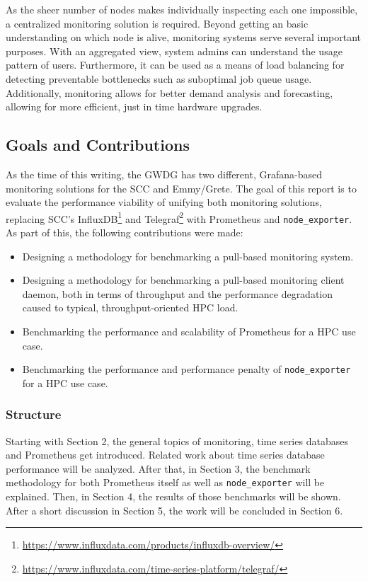 As the sheer number of nodes makes individually inspecting each one impossible, a centralized
monitoring solution is required. Beyond getting an basic understanding on which node is alive, 
monitoring systems serve several important purposes. With an aggregated view, system admins can
understand the usage pattern of users. Furthermore, it can be used as a means of load balancing 
for detecting preventable bottlenecks such as suboptimal job queue usage. Additionally, monitoring
allows for better demand analysis and forecasting, allowing for more efficient, just in time 
hardware upgrades.

\subsection{Goals and Contributions}

As the time of this writing, the GWDG has two different, Grafana-based monitoring solutions for 
the \ac{SCC} and Emmy/Grete. The goal of this report is to evaluate the performance viability of
unifying both monitoring solutions, replacing \ac{SCC}'s InfluxDB\footnote{
\url{https://www.influxdata.com/products/influxdb-overview/}} and Telegraf\footnote{
\url{https://www.influxdata.com/time-series-platform/telegraf/}} with Prometheus and 
\texttt{node\_exporter}.
As part of this, the following contributions were made:
\begin{itemize}
\item Designing a methodology for benchmarking a pull-based monitoring system.
\item Designing a methodology for benchmarking a pull-based monitoring client daemon, both in 
terms of throughput and the performance degradation caused to typical, throughput-oriented 
\ac{HPC} load.
\item Benchmarking the performance and scalability of Prometheus for a \ac{HPC} use case.
\item Benchmarking the performance and performance penalty of \texttt{node\_exporter} for a 
\ac{HPC} use case.
\end{itemize}

\subsubsection{Structure}
Starting with Section 2, the general topics of monitoring, time series databases and
Prometheus get introduced. Related work about time series database performance will be analyzed.
After that, in Section 3, the benchmark methodology for both Prometheus itself as well as
\texttt{node\_exporter} will be explained. Then, in Section 4, the results of those benchmarks
will be shown. After a short discussion in Section 5, the work will be concluded in Section 6.

